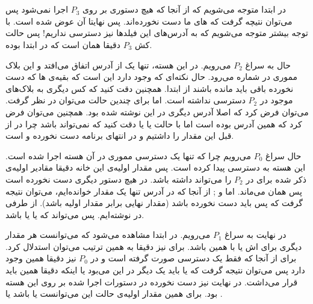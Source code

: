 \section{}
در ابتدا متوجه می‌شویم که از آنجا که هیچ دستوری بر روی
$P_3$
اجرا نمی‌شود پس می‌توان نتیچه گرفت که
های
ما دست نخورده‌اند. پس نهایتا
آن عوض شده است. با توجه بیشتر متوجه می‌شویم که به آدرس‌های این فیلد‌ها نیز دسترسی نداریم! پس حالت کش
$P_3$
دقیقا همان است که در ابتدا بوده.

حال به سراغ
$P_2$
می‌رویم. در این هسته، تنها یک
از آدرس
اتفاق می‌افتد و این بلاک مموری در شماره
می‌رود. حال نکته‌ای که وجود دارد این است که بقیه‌ی
ها
که دست نخورده باقی باید مانده باشند از ابتدا. همچنین دقت کنید که کس دیگری به بلاک‌های موجود در
$P_2$
دسترسی نداشته است. اما برای
چندین حالت می‌توان در نظر گرفت. می‌توان فرض کرد که اصلا آدرس دیگری در این
نوشته شده بود. همچنین  می‌توان فرض کرد که همین آدرس بوده است اما با حالت
 یا  یا 
دقت کنید که
نمی‌تواند باشد چرا در 
از قبل این مقدار را داشتیم و در انتهای برنامه دست نخورده و
است.

حال سراغ
$P_0$
می‌رویم چرا که تنها یک دسترسی مموری در آن هسته اجرا شده است. این هسته به
دسترسی پیدا کرده است. پس مقدار اولیه‌ی این خانه دقیقا مقادیر اولیه‌ی ذکر شده برای
در
$P_2$
را می‌تواند داشته باشد.
در هیچ دستور دیگری دست نخورده است پس همان می‌ماند. اما
 و ;
از آنجا که در آدرس
تنها یک مقدار خوانده‌ایم، می‌توان نتیجه گرفت که پس 
باید دست نخورده باشد (مقدار نهایی برابر مقدار اولیه باشد). از طرفی در
نوشته‌ایم. پس
می‌تواند که
 یا  یا 
باشد.

در نهایت به سراغ
$P_1$
می‌رویم. در ابتدا مشاهده می‌شود که
می‌توانست هر مقدار دیگری برای
اش
یا
 با همین 
باشد. برای
نیز دقیقا به همین ترتیب می‌توان استدلال کرد.
برای
از آنجا که فقط یک دسترسی
صورت گرفته است و در
$P_0$
نیز دقیقا همین
وجود دارد پس می‌توان نتیجه گرفت که یا باید یک
دیگر در این
می‌بود یا اینکه دقیقا همین
باید قرار می‌داشت. در نهایت
نیز دست نخورده در دستورات اجرا شده بر روی این هسته بود. برای همین مقدار اولیه‌ی حالت این
می‌توانست یا
 باشد یا .

